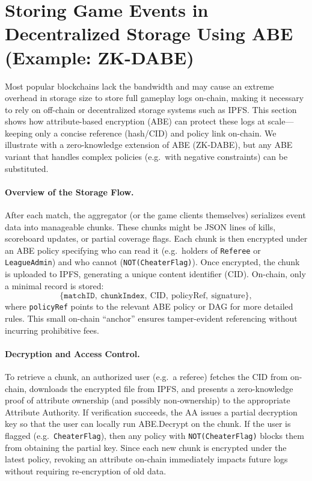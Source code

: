 \documentclass[11pt]{article}
\begin{document}
\section{Storing Game Events in Decentralized Storage Using ABE (Example: ZK-DABE)}
\label{sec:storing-game-data}

Most popular blockchains lack the bandwidth and may cause an extreme overhead in storage size    to store full gameplay logs on-chain, making it necessary to rely on off-chain or decentralized storage systems such as IPFS. This section shows how attribute-based encryption (ABE) \cite{herranz2017} can protect these logs at scale—keeping only a concise reference (hash/CID) and policy link on-chain. We illustrate with a zero-knowledge extension of ABE (ZK-DABE), but any ABE variant that handles complex policies (e.g.\ with negative constraints) can be substituted.

\paragraph{Overview of the Storage Flow.}
After each match, the aggregator (or the game clients themselves) serializes event data into manageable chunks. These chunks might be JSON lines of kills, scoreboard updates, or partial coverage flags. Each chunk is then encrypted under an ABE policy specifying who can read it (e.g.\ holders of \texttt{Referee} or \texttt{LeagueAdmin}) and who cannot (\texttt{NOT(CheaterFlag)}). Once encrypted, the chunk is uploaded to IPFS, generating a unique content identifier (CID). On-chain, only a minimal record is stored:
\[
  \{\texttt{matchID}, \ \texttt{chunkIndex}, \ \mathrm{CID}, \ \mathrm{policyRef}, \ \mathrm{signature}\},
\]
where \texttt{policyRef} points to the relevant ABE policy or DAG for more detailed rules. This small on-chain “anchor” ensures tamper-evident referencing without incurring prohibitive fees.

\paragraph{Decryption and Access Control.}
To retrieve a chunk, an authorized user (e.g.\ a referee) fetches the CID from on-chain, downloads the encrypted file from IPFS, and presents a zero-knowledge proof of attribute ownership (and possibly non-ownership) to the appropriate Attribute Authority. If verification succeeds, the AA issues a partial decryption key so that the user can locally run \textsf{ABE.Decrypt} on the chunk. If the user is flagged (e.g.\ \texttt{CheaterFlag}), then any policy with \texttt{NOT(CheaterFlag)} blocks them from obtaining the partial key. Since each new chunk is encrypted under the latest policy, revoking an attribute on-chain immediately impacts future logs without requiring re-encryption of old data.
\end{document}
